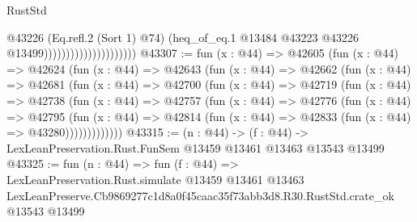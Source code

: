 \begin{lexlean}{RustStd}
\begin{coremodule}
                                            @43226
                                            (Eq.refl.{2} (Sort 1) @74)
                                            (heq_of_eq.{1}
                                              @13484
                                              @43223
                                              @43226
                                              @13499)))))))))))))))))))))
@43307 := fun (x : @44) =>
  @42605
    (fun (x : @44) =>
    @42624
      (fun (x : @44) =>
      @42643
        (fun (x : @44) =>
        @42662
          (fun (x : @44) =>
          @42681
            (fun (x : @44) =>
            @42700
              (fun (x : @44) =>
              @42719
                (fun (x : @44) =>
                @42738
                  (fun (x : @44) =>
                  @42757
                    (fun (x : @44) =>
                    @42776
                      (fun (x : @44) =>
                      @42795
                        (fun (x : @44) =>
                        @42814 (fun (x : @44) => @42833 (fun (x : @44) => @43280)))))))))))))
@43315 := (n : @44) ->
  (f : @44) -> LexLeanPreservation.Rust.FunSem @13459 @13461 @13463 @13543 @13499
@43325 := fun (n : @44) =>
  fun (f : @44) =>
  LexLeanPreservation.Rust.simulate
    @13459
    @13461
    @13463
    LexLeanPreserve.Cb9869277c1d8a0f45caac35f73abb3d8.R30.RustStd.crate_ok
    @13543
    @13499
\end{coremodule}
\end{lexlean}
